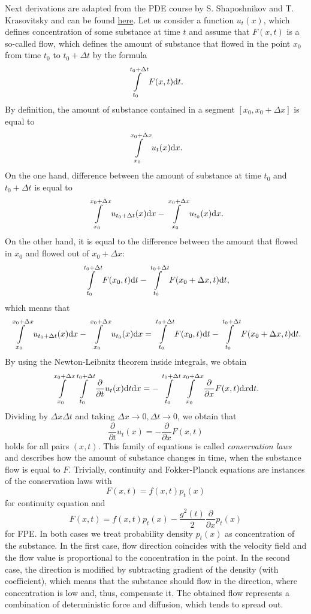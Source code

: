 Next derivations are adapted from the PDE course by S. Shaposhnikov and T. Krasovitsky and can be found \href{http://wiki.cs.hse.ru/%D0%A3%D1%80%D0%B0%D0%B2%D0%BD%D0%B5%D0%BD%D0%B8%D1%8F_%D1%81_%D1%87%D0%B0%D1%81%D1%82%D0%BD%D1%8B%D0%BC%D0%B8_%D0%BF%D1%80%D0%BE%D0%B8%D0%B7%D0%B2%D0%BE%D0%B4%D0%BD%D1%8B%D0%BC%D0%B8_(2022-2023)}{here}. Let us consider a function $u_t(x)$, which defines concentration of some substance at time $t$ and assume that $F(x, t)$ is a so-called flow, which defines the amount of substance that flowed in the point $x_0$ from time $t_0$ to $t_0 + \Delta t$ by the formula 
\[
    \int\limits_{t_0}^{t_0 + \Delta t} F(x, t) \mathrm{d} t.
\]
By definition, the amount of substance contained in a segment $[x_0, x_0 + \Delta x]$ is equal to
\[
    \int\limits_{x_0}^{x_0 + \Delta x} u_t(x) \mathrm{d} x.
\]
On the one hand, difference between the amount of substance at time $t_0$ and $t_0 + \Delta t$ is equal to
\[
    \int\limits_{x_0}^{x_0 + \Delta x} u_{t_0 + \Delta t}(x) \mathrm{d} x -     \int\limits_{x_0}^{x_0 + \Delta x} u_{t_0}(x) \mathrm{d} x.
\]
On the other hand, it is equal to the difference between the amount that flowed in $x_0$ and flowed out of $x_0 + \Delta x$:
\[
    \int\limits_{t_0}^{t_0 + \Delta t} F(x_0, t) \mathrm{d} t -     \int\limits_{t_0}^{t_0 + \Delta t} F(x_0 + \Delta x, t) \mathrm{d} t,
\]
which means that
\[
    \int\limits_{x_0}^{x_0 + \Delta x} u_{t_0 + \Delta t}(x) \mathrm{d} x -     \int\limits_{x_0}^{x_0 + \Delta x} u_{t_0}(x) \mathrm{d} x = \int\limits_{t_0}^{t_0 + \Delta t} F(x_0, t) \mathrm{d} t -     \int\limits_{t_0}^{t_0 + \Delta t} F(x_0 + \Delta x, t) \mathrm{d} t.
\]
By using the Newton-Leibnitz theorem inside integrals, we obtain
\[
    \int\limits_{x_0}^{x_0 + \Delta x} \int\limits_{t_0}^{t_0 + \Delta t} \frac{\partial}{\partial t} u_t(x) \mathrm{d} t \mathrm{d} x = - \int\limits_{t_0}^{t_0 + \Delta t}\int\limits_{x_0}^{x_0 + \Delta x} \frac{\partial}{\partial x} F(x, t) \mathrm{d} x \mathrm{d} t.
\]
Dividing by $\Delta x \Delta t$ and taking $\Delta x \rightarrow 0, \Delta t \rightarrow 0$, we obtain that
\[
    \frac{\partial}{\partial t} u_{t}(x) = -\frac{\partial}{\partial x}F(x, t)
\]
holds for all pairs $(x, t)$. This family of equations is called \emph{conservation laws} and describes how the amount of substance changes in time, when the substance flow is equal to $F$. Trivially, continuity and Fokker-Planck equations are instances of the conservation laws with
\[
    F(x, t) = f(x, t)p_t(x)
\]
for continuity equation and
\[
    F(x, t) = f(x, t)p_t(x) - \frac{g^2(t)}{2} \frac{\partial}{\partial x} p_t(x)
\]
for FPE. In both cases we treat probability density $p_t(x)$ as concentration of the substance. In the first case, flow direction coincides with the velocity field and the flow value is proportional to the concentration in the point. In the second case, the direction is modified by subtracting gradient of the density (with coefficient), which means that the substance should flow in the direction, where concentration is low and, thus, compensate it. The obtained flow represents a combination of deterministic force and diffusion, which tends to spread out.

